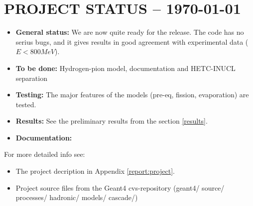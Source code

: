 \section{PROJECT STATUS -- \today  } %


\begin{itemize}
\item {\bf General status:} 
We are now quite ready for the release. 
The code has no serius bugs,
and it gives results in good agreement with experimental data ( $E < 800 MeV$). 
\item {\bf To be done:} Hydrogen-pion model, 
documentation  and HETC-INUCL separation
\item {\bf Testing:} The major features of the models (pre-eq, fission, evaporation) are tested. 
\item {\bf Results:} See the preliminary results from the section \ref{results}.
\item {\bf Documentation:} 
\end{itemize}


For more detailed info see: 
\begin{itemize}
\item The project decription in Appendix \ref{report:project}.
 \item Project source files from the Geant4 cvs-repository (geant4/ source/ processes/ hadronic/ models/ cascade/)  

\end{itemize}



